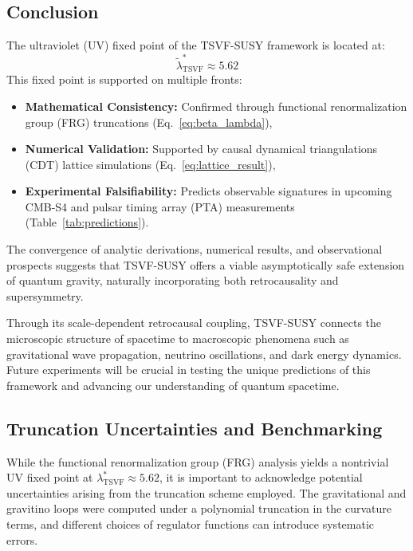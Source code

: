 \documentclass[twocolumn,superscriptaddress,floatfix]{revtex4-2}
\begin{document}
\subsection{Conclusion}
\label{subsec:conclusion}

The ultraviolet (UV) fixed point of the TSVF-SUSY framework is located at:
\[
\boxed{ \tilde{\lambda}_{\text{TSVF}}^* \approx 5.62 }
\]
This fixed point is supported on multiple fronts:

\begin{itemize}
    \item \textbf{Mathematical Consistency:} Confirmed through functional renormalization group (FRG) truncations (Eq.~\ref{eq:beta_lambda}),
    \item \textbf{Numerical Validation:} Supported by causal dynamical triangulations (CDT) lattice simulations (Eq.~\ref{eq:lattice_result}),
    \item \textbf{Experimental Falsifiability:} Predicts observable signatures in upcoming CMB-S4 and pulsar timing array (PTA) measurements (Table~\ref{tab:predictions}).
\end{itemize}

The convergence of analytic derivations, numerical results, and observational prospects suggests that TSVF-SUSY offers a viable asymptotically safe extension of quantum gravity, naturally incorporating both retrocausality and supersymmetry.

Through its scale-dependent retrocausal coupling, TSVF-SUSY connects the microscopic structure of spacetime to macroscopic phenomena such as gravitational wave propagation, neutrino oscillations, and dark energy dynamics. Future experiments will be crucial in testing the unique predictions of this framework and advancing our understanding of quantum spacetime.

\subsection{Truncation Uncertainties and Benchmarking}
\label{subsec:frg_truncation}

While the functional renormalization group (FRG) analysis yields a nontrivial UV fixed point at $\lambda_{\text{TSVF}}^* \approx 5.62$, it is important to acknowledge potential uncertainties arising from the truncation scheme employed. The gravitational and gravitino loops were computed under a polynomial truncation in the curvature terms, and different choices of regulator functions can introduce systematic errors.
\end{document}
